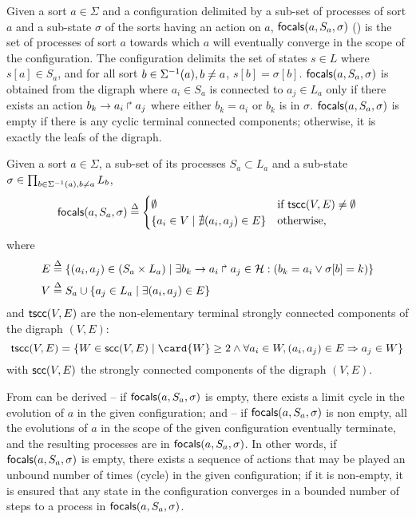 Given a sort $a\in\Sigma$ and a configuration delimited by 
a sub-set of processes of sort $a$ and a sub-state $\sigma$
of the sorts having an action on $a$,
$\mathsf{focals}(a,S_a,\sigma)$ () is the set of processes of sort $a$ towards which
$a$ will eventually converge in the scope of the configuration.
The configuration delimits the set of states $s\in L$ where $s[a]\in S_a$, and for all 
sort $b\in\Sigma^{-1}(a), b\neq a$,
$s[b]=\sigma[b]$.
$\mathsf{focals}(a,S_a,\sigma)$ is obtained from the digraph where $a_i\in S_a$ is connected to $a_j\in L_a$ only if there
exists an action $b_k\rightarrow a_i\Rsh a_j$ where either $b_k = a_i$ or $b_k$ is in $\sigma$.
$\mathsf{focals}(a,S_a,\sigma)$ is empty if there is any cyclic terminal connected components;
otherwise, it is exactly the leafs of the digraph.


\begin{definition}\label{def:focals}
Given a sort $a\in\Sigma$, a sub-set of its processes $S_a\subset L_a$ 
and a sub-state
$\sigma \in {\prod_{b\in\Sigma^{-1}(a), b\neq a} L_{b}}$,
\[
\mathsf{focals}(a,S_a,\sigma) \stackrel{\Delta}=
\begin{cases}
\emptyset & \text{if }\mathsf{tscc}(V,E)\neq\emptyset\\
\{ a_i \in V \mid \nexists (a_i,a_j)\in E\} & \text{otherwise,}
\end{cases}
\]
where
\begin{align}
E  & \stackrel{\Delta}= \{(a_i,a_j)\in (S_a \times L_a) \mid 
			\exists b_k\rightarrow a_i\Rsh a_j\in \mathcal{H}:
				(b_k = a_i \vee \sigma[b]=k) \}
\\
V & \stackrel{\Delta}= S_a \cup \{ a_j\in L_a\mid \exists (a_i,a_j)\in E\}
\end{align}
and $\mathsf{tscc}(V,E)$ are the non-elementary terminal strongly connected components of the digraph
$(V,E)$:
\[
\f{tscc}(V,E) = \{
W\in\f{scc}(V,E) \mid \card{W}\geq 2\wedge \forall a_i\in W, (a_i,a_j)\in E\Rightarrow a_j\in W\}
\]
with $\mathsf{scc}(V,E)$ the strongly connected components of the digraph $(V,E)$.
\end{definition}

From  can be derived 
 -- if $\mathsf{focals}(a,S_a,\sigma)$ is empty, there exists a limit cycle in the evolution of
$a$ in the given configuration;
and  -- if $\mathsf{focals}(a,S_a,\sigma)$ is non empty, all the evolutions of $a$ in the scope
of the given configuration eventually terminate, and the resulting processes are in $\mathsf{focals}(a,S_a,\sigma)$.
In other words, if $\mathsf{focals}(a,S_a,\sigma)$ is empty, there exists a
sequence of actions that may be played an unbound number of times (cycle) in the
given configuration;
if it is non-empty, it is ensured that any state in the configuration converges 
in a bounded number of steps to a process in $\mathsf{focals}(a,S_a,\sigma)$.

